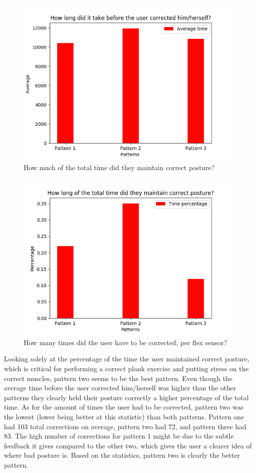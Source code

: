 \documentclass[sigconf]{acmart}
\begin{document}
\begin{figure}[hb]
\centering
\includegraphics[width=1\columnwidth, scale=1]{p_q2.png}
\caption{How much of the total time did they maintain correct posture?}
\end{figure}

\begin{figure}[h!]
\centering
\includegraphics[width=1\columnwidth, scale=1]{p_q3.png}
\caption{How many times did the user have to be corrected, per flex sensor?}
\end{figure} 


Looking solely at the percentage of the time the user maintained correct posture, which is critical for performing a correct plank exercise and putting stress on the correct muscles, pattern two seems to be the best pattern. Even though the average time before the user corrected him/herself was higher than the other patterns they clearly held their posture correctly a higher percentage of the total time. As for the amount of times the user had to be corrected, pattern two was the lowest (lower being better at this statistic) than both patterns. Pattern one had 103 total corrections on average, pattern two had 72, and pattern three had 83. The high number of corrections for pattern 1 might be due to the subtle feedback it gives compared to the other two, which gives the user a clearer idea of where bad posture is.
Based on the statistics, pattern two is clearly the better pattern.
\end{document}
